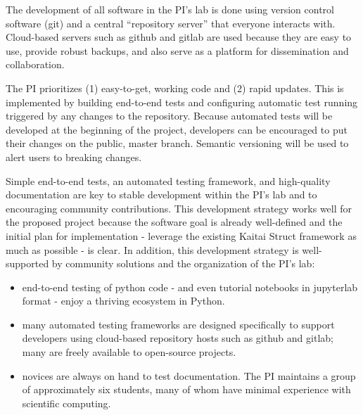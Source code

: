 The development of all software in the PI's lab is done using version control software (git) and a central ``repository server'' that everyone interacts with.  Cloud-based servers such as github and gitlab are used because they are easy to use, provide robust backups, and also serve as a platform for dissemination and collaboration.

The PI prioritizes (1) easy-to-get, working code and (2) rapid updates.  This is implemented by building end-to-end tests and configuring automatic test running triggered by any changes to the repository.  Because automated tests will be developed at the beginning of the project, developers can be encouraged to put their changes on the public, master branch.  Semantic versioning will be used to alert users to breaking changes.


Simple end-to-end tests,  an automated testing framework, and high-quality documentation are key to stable development within the PI's lab and to encouraging community contributions.  This development strategy works well for the proposed project because the software goal is already well-defined and the initial plan for implementation - leverage the existing Kaitai Struct framework as much as possible - is clear.  In addition, this development strategy is well-supported by community solutions and the organization of the PI's lab:

\begin{itemize}
    \item end-to-end testing of python code - and even tutorial notebooks in jupyterlab format - enjoy a thriving ecosystem in Python.
    \item many automated testing frameworks are designed specifically to support developers using cloud-based repository hosts such as github and gitlab; many are freely available to open-source projects.
    \item novices are always on hand to test documentation.  The PI maintains a group of approximately six students, many of whom have minimal experience with scientific computing.
\end{itemize}


